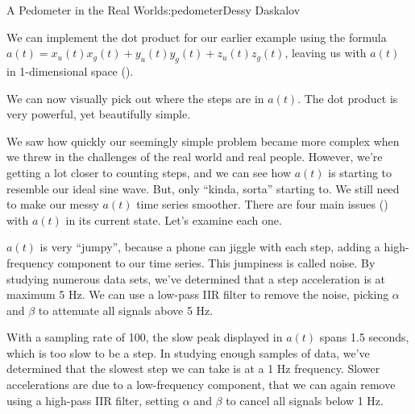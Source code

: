\begin{aosachapter}{A Pedometer in the Real World}{s:pedometer}{Dessy Daskalov}

\label{implementing-the-dot-product}

We can implement the dot product for our earlier example using the
formula $a(t) = x_{u}(t)x_{g}(t) + y_{u}(t)y_{g}(t) + z_{u}(t)z_{g}(t)$,
leaving us with $a(t)$ in 1-dimensional space
().


We can now visually pick out where the steps are in $a(t)$. The dot
product is very powerful, yet beautifully simple.

\label{solutions-in-the-real-world}

We saw how quickly our seemingly simple problem became more complex when
we threw in the challenges of the real world and real people. However,
we're getting a lot closer to counting steps, and we can see how $a(t)$
is starting to resemble our ideal sine wave. But, only ``kinda, sorta''
starting to. We still need to make our messy $a(t)$ time series
smoother. There are four main issues
() with $a(t)$ in its current state.
Let's examine each one.


\label{jumpy-peaks}

$a(t)$ is very ``jumpy'', because a phone can jiggle with each step,
adding a high-frequency component to our time series. This jumpiness is
called noise. By studying numerous data sets, we've determined that a
step acceleration is at maximum 5 Hz. We can use a low-pass IIR filter
to remove the noise, picking $\alpha$ and $\beta$ to attenuate all
signals above 5 Hz.

\label{slow-peaks}

With a sampling rate of 100, the slow peak displayed in $a(t)$ spans 1.5
seconds, which is too slow to be a step. In studying enough samples of
data, we've determined that the slowest step we can take is at a 1 Hz
frequency. Slower accelerations are due to a low-frequency component,
that we can again remove using a high-pass IIR filter, setting $\alpha$
and $\beta$ to cancel all signals below 1 Hz.


\end{aosachapter}
